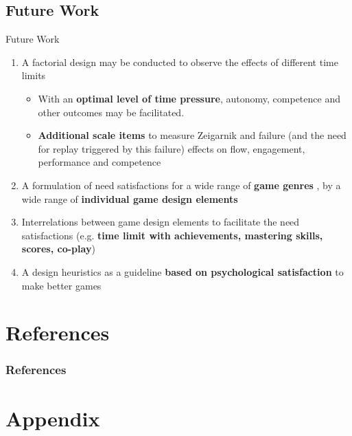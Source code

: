 \documentclass{beamer}
\begin{document}
\subsection{Future Work}
\begin{frame}{Future Work}
\begin{adjustwidth}{-1.8em}{-1.8em}
  \begin{enumerate}
  \item A \alert{factorial design} may be conducted to observe the effects of \alert{different time limits}
  \begin{itemize}
  	\item With an \textbf{optimal level of time pressure}, autonomy, competence and other outcomes may be facilitated.
  	\item \textbf{Additional scale items} to measure Zeigarnik and failure (and the need for replay triggered by this failure) effects on flow, engagement, performance and competence
  \end{itemize}
  \item A \alert{formulation of need satisfactions} for a wide range of \textbf{game genres} \cite{RyanRigby2011glued}, by a wide range of \textbf{individual game design elements}
  \item \alert{Interrelations between game design elements} to facilitate the need satisfactions (e.g. \textbf{time limit with achievements, mastering skills, scores, co-play})
  \item \alert{A design heuristics} as a guideline \textbf{based on psychological satisfaction} to make better games
  \end{enumerate}
 \end{adjustwidth}
\end{frame}

\section{References}
\begin{frame}[allowframebreaks]
\fontsize{5pt}{5}\selectfont
  \frametitle<presentation>{References}


\end{frame}


\appendix
\section*{Appendix}
\end{document}
